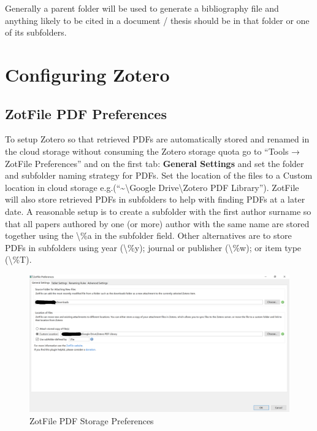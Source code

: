 \documentclass[
]{book}
\begin{document}
Generally a parent folder will be used to generate a bibliography file and anything likely to be cited in a document / thesis should be in that folder or one of its subfolders.

\hypertarget{configuring-zotero}{%
\section{Configuring Zotero}\label{configuring-zotero}}

\hypertarget{zotfile-pdf-preferences}{%
\subsection{ZotFile PDF Preferences}\label{zotfile-pdf-preferences}}

To setup Zotero so that retrieved PDFs are automatically stored and renamed in the cloud storage without consuming the Zotero storage quota go to ``Tools → ZotFile Preferences'' and on the first tab: \textbf{General Settings} and set the folder and subfolder naming strategy for PDFs. Set the location of the files to a Custom location in cloud storage e.g.(``\textasciitilde\textbackslash Google Drive\textbackslash Zotero PDF Library''). ZotFile will also store retrieved PDFs in subfolders to help with finding PDFs at a later date. A reasonable setup is to create a subfolder with the first author surname so that all papers authored by one (or more) author with the same name are stored together using the \textbackslash\%a in the subfolder field. Other alternatives are to store PDFs in subfolders using year (\textbackslash\%y); journal or publisher (\textbackslash\%w); or item type (\textbackslash\%T).

\begin{figure}
\includegraphics[width=44.44in]{img/zotfile_preferences} \caption{ZotFile PDF Storage Preferences}\label{fig:zotfile-preferences}
\end{figure}
\end{document}
